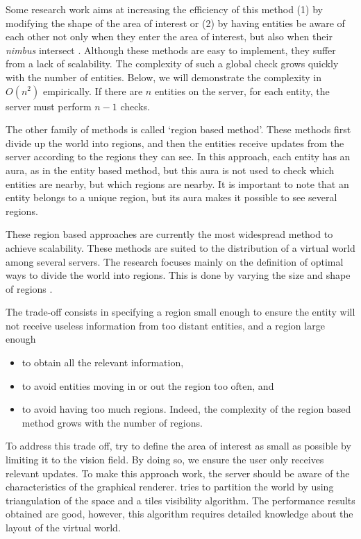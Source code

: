 \documentclass[]{elsarticle}
\begin{document}
Some research work aims at increasing the efficiency of this method (1) by modifying the shape of the area of interest or (2) by having entities be aware of each other not only when they enter the area of interest, but also when their \textit{nimbus} intersect \cite{Benford+Fahlen.1993}.
Although these methods are easy to implement, they suffer from a lack of scalability. The complexity of such a global check grows quickly with the number of entities. Below, we will demonstrate the complexity in $O(n^2)$ empirically. If there are $n$ entities on the server, for each entity, the server must perform $n-1$ checks.

The other family of methods is called `region based method'. These methods first divide up the world into regions, and then the entities receive updates from the server according to the regions they can see. In this approach, each entity has an aura, as in the entity based method, but this aura is not used to check which entities are nearby, but which regions are nearby. It is important to note that an entity belongs to a unique region, but its aura makes it possible to see several regions.

These region based approaches are currently the most widespread method to achieve scalability. These methods are suited to the distribution of a virtual world among several servers.
The research focuses mainly on the definition of optimal ways to divide the world into regions. This is done by varying the size and shape of regions \cite{Boulanger+others.2006}.

The trade-off consists in specifying a region small enough to ensure the entity will not receive useless information from too distant entities, and a region large enough

\begin{itemize}
\item to obtain all the relevant information,
\item to avoid entities moving in or out the region too often, and
\item to avoid having too much regions. Indeed, the complexity of the region based method grows with the number of regions.
\end{itemize}

To address this trade off, \cite{Hosseini2002} try to define the area of interest as small as possible by limiting it to the vision field. By doing so, we ensure the user only receives relevant updates. To make this approach work, the server should be aware of the characteristics of the graphical renderer.
\cite{Boulanger+others.2006} tries to partition the world by using triangulation of the space and a tiles visibility algorithm. The performance results obtained are good, however, this algorithm requires detailed knowledge about the layout of the virtual world.
\end{document}
